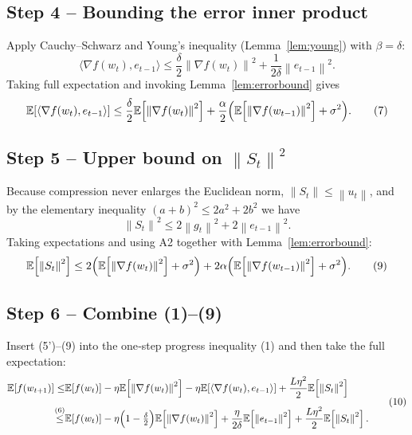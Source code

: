 \documentclass{article}
\newcommand{\E}{\mathbb{E}}
\newcommand{\norm}[1]{\left\lVert#1\right\rVert}
\begin{document}
\subsection*{Step 4 – Bounding the error inner product}
Apply Cauchy–Schwarz and Young’s inequality (Lemma~\ref{lem:young}) with
$\beta=\delta$:
\begin{equation}
\langle\nabla f(w_t),e_{t-1}\rangle
\le \frac{\delta}{2}\norm{\nabla f(w_t)}^{2}
   +\frac{1}{2\delta}\norm{e_{t-1}}^{2}.
\tag{6}
\end{equation}
Taking full expectation and invoking Lemma~\ref{lem:errorbound} gives
\begin{equation}
\E\!\left[\langle\nabla f(w_t),e_{t-1}\rangle\right]
\le \frac{\delta}{2}\E\!\left[\norm{\nabla f(w_t)}^{2}\right]
   +\frac{\alpha}{2}\Bigl(\E\!\left[\norm{\nabla f(w_{t-1})}^{2}\right]
   +\sigma^{2}\Bigr).
\tag{7}
\end{equation}

\subsection*{Step 5 – Upper bound on $\norm{S_t}^{2}$}
Because compression never enlarges the Euclidean norm,
$\norm{S_t}\le\norm{u_t}$, and by the elementary inequality
$(a+b)^{2}\le2a^{2}+2b^{2}$ we have
\begin{equation}
\norm{S_t}^{2}\le 2\norm{g_t}^{2}+2\norm{e_{t-1}}^{2}.
\tag{8}
\end{equation}
Taking expectations and using A2 together with Lemma~\ref{lem:errorbound}:
\begin{equation}
\E\!\left[\norm{S_t}^{2}\right]
\le 2\Bigl(\E\!\left[\norm{\nabla f(w_t)}^{2}\right]+\sigma^{2}\Bigr)
   +2\alpha\Bigl(\E\!\left[\norm{\nabla f(w_{t-1})}^{2}\right]
   +\sigma^{2}\Bigr).
\tag{9}
\end{equation}

\subsection*{Step 6 – Combine (1)–(9)}
Insert (5')–(9) into the one‑step progress inequality (1) and then take the
full expectation:
\[
\begin{aligned}
\E\!\left[f(w_{t+1})\right]
\le &\E\!\left[f(w_t)\right]
-\eta\E\!\left[\norm{\nabla f(w_t)}^{2}\right]
-\eta\E\!\left[\langle\nabla f(w_t),e_{t-1}\rangle\right]
+\frac{L\eta^{2}}{2}\E\!\left[\norm{S_t}^{2}\right] \\[4pt]
\stackrel{(6)}{\le}
&\E\!\left[f(w_t)\right]
-\eta\Bigl(1-\tfrac{\delta}{2}\Bigr)\E\!\left[\norm{\nabla f(w_t)}^{2}\right]
+\frac{\eta}{2\delta}\E\!\left[\norm{e_{t-1}}^{2}\right]
+\frac{L\eta^{2}}{2}\E\!\left[\norm{S_t}^{2}\right].
\end{aligned}
\tag{10}
\]
\end{document}
